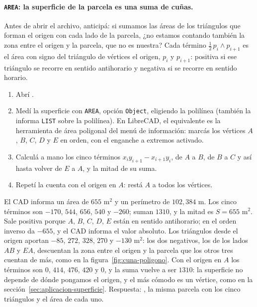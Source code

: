 \paragraph{\texttt{AREA}: la superficie de la parcela es una suma de cuñas.} Antes de abrir el
archivo, anticipá: si sumamos las áreas de los triángulos que forman el origen con cada lado de
la parcela, ¿no estamos contando también la zona entre el origen y la parcela, que no es
nuestra? Cada término \(\tfrac12\,p_i\wedge p_{i+1}\) es el área con signo del triángulo de
vértices el origen, \(p_i\) y \(p_{i+1}\): positiva si ese triángulo se recorre en sentido
antihorario y negativa si se recorre en sentido horario.
\begin{enumerate}
  \item Abrí .
  \item Medí la superficie con \texttt{AREA}, opción \texttt{Object}, eligiendo la polilínea
  (también la informa \texttt{LIST} sobre la polilínea). En LibreCAD, el equivalente es la
  herramienta de área poligonal del menú de información: marcás los vértices \(A\), \(B\),
  \(C\), \(D\) y \(E\) en orden, con el enganche a extremos activado.
  \item Calculá a mano los cinco términos \(x_iy_{i+1}-x_{i+1}y_i\), de \(A\) a \(B\), de \(B\)
  a \(C\) y así hasta volver de \(E\) a \(A\), y la mitad de su suma.
  \item Repetí la cuenta con el origen en \(A\): restá \(A\) a todos los vértices.
\end{enumerate}
El CAD informa un área de \(655\) m\(^2\) y un perímetro de \(102{,}384\) m. Los cinco términos
son \(-170\), \(544\), \(656\), \(540\) y \(-260\); suman \(1310\), y la mitad es
\(S=655\) m\(^2\). Sale positiva porque \(A\), \(B\), \(C\), \(D\), \(E\) están en sentido
antihorario; en el orden inverso da \(-655\), y el CAD informa el valor absoluto. Los
triángulos desde el origen aportan \(-85\), \(272\), \(328\), \(270\) y \(-130\) m\(^2\): los
dos negativos, los de los lados \(AB\) y \(EA\), descuentan la zona entre el origen y la parcela
que los otros tres cuentan de más, como en la figura~\ref{fig:cuna-poligono}. Con el origen en
\(A\) los términos son \(0\), \(414\), \(476\), \(420\) y \(0\), y la suma vuelve a ser
\(1310\): la superficie no depende de dónde pongamos el origen, y el más cómodo es un vértice,
como en la sección~\ref{sec:aplicacion-superficie}. Respuesta:
, la misma parcela con los cinco triángulos y el área
de cada uno.

